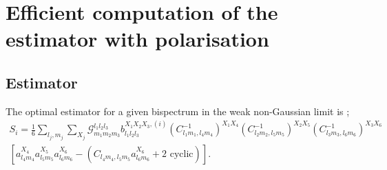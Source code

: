 \section{Efficient computation of the estimator with polarisation} \label{section: Efficient computation of KSW estimator with polarisation}

\subsection{Estimator}

The optimal estimator for a given bispectrum in the weak non-Gaussian limit is \cite{Komatsu2005,Komatsu2010};
\begin{eqnarray}
	S_i =  \frac{1}{6} \sum_{l_j, m_j} \sum_{X_j} \mathcal{G}_{m_1 m_2 m_3}^{l_1 l_2 l_3} b_{l_1 l_2 l_3} ^{X_1 X_2 X_3, (i)} (C_{l_1 m_1, l_4 m_4}^{-1})^{X_1 X_4} (C_{l_2 m_2, l_5 m_5}^{-1})^{X_2 X_5} (C_{l_3 m_3, l_6 m_6}^{-1})^{X_3 X_6} \nonumber \\  \left[ a_{l_4 m_4}^{X_4} a_{l_5 m_5}^{X_5} a_{l_6 m_6}^{X_6} -  \left( C_{l_4 m_4, l_5 m_5} a_{l_6 m_6}^{X_6} + \text{2 cyclic} \right)   \right].
	\label{Estimator full definition}
\end{eqnarray}

